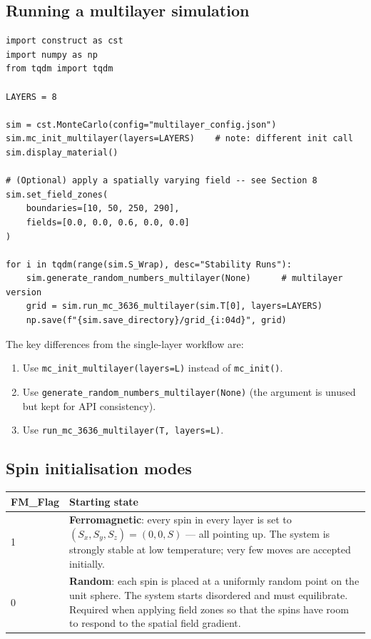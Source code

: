 \documentclass[12pt,a4paper]{article}
\newcommand{\code}[1]{\texttt{#1}}
\begin{document}
\subsection{Running a multilayer simulation}

\begin{lstlisting}[style=python, caption={multilayer.py workflow}]
import construct as cst
import numpy as np
from tqdm import tqdm

LAYERS = 8

sim = cst.MonteCarlo(config="multilayer_config.json")
sim.mc_init_multilayer(layers=LAYERS)    # note: different init call
sim.display_material()

# (Optional) apply a spatially varying field -- see Section 8
sim.set_field_zones(
    boundaries=[10, 50, 250, 290],
    fields=[0.0, 0.0, 0.6, 0.0, 0.0]
)

for i in tqdm(range(sim.S_Wrap), desc="Stability Runs"):
    sim.generate_random_numbers_multilayer(None)      # multilayer version
    grid = sim.run_mc_3636_multilayer(sim.T[0], layers=LAYERS)
    np.save(f"{sim.save_directory}/grid_{i:04d}", grid)
\end{lstlisting}

The key differences from the single-layer workflow are:
\begin{enumerate}
  \item Use \code{mc\_init\_multilayer(layers=L)} instead of \code{mc\_init()}.
  \item Use \code{generate\_random\_numbers\_multilayer(None)} (the argument is
        unused but kept for API consistency).
  \item Use \code{run\_mc\_3636\_multilayer(T, layers=L)}.
\end{enumerate}

\subsection{Spin initialisation modes}

\begin{center}
\begin{tabular}{lp{10cm}}
\toprule
\textbf{FM\_Flag} & \textbf{Starting state} \\
\midrule
1 & \textbf{Ferromagnetic}: every spin in every layer is set to
    $(S_x, S_y, S_z) = (0, 0, S)$ --- all pointing up. The system is
    strongly stable at low temperature; very few moves are accepted
    initially. \\[0.3em]
0 & \textbf{Random}: each spin is placed at a uniformly random point
    on the unit sphere. The system starts disordered and must equilibrate.
    Required when applying field zones so that the spins have room to
    respond to the spatial field gradient. \\
\bottomrule
\end{tabular}
\end{center}
\end{document}
